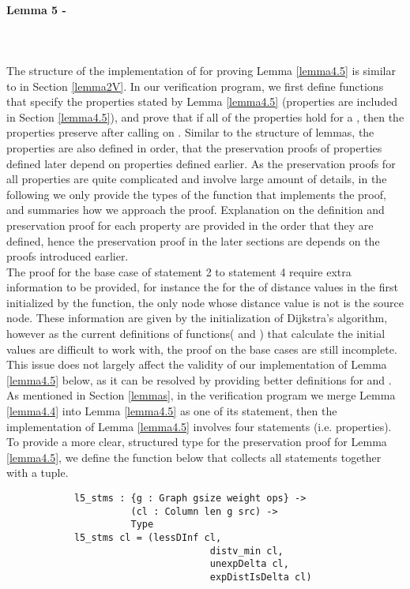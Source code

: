 \paragraph{Lemma 5 - } \label{lemma5V}
\tab\\\\
The structure of the implementation of  for proving Lemma \ref{lemma4.5} is similar to  in Section \ref{lemma2V}. In our verification program, we first define functions that specify the  properties stated by Lemma \ref{lemma4.5} (properties are included in Section \ref{lemma4.5}), and prove that if all of the properties hold for a  , then the properties preserve after calling  on . Similar to the structure of lemmas, the properties are also defined in order, that the preservation proofs of properties defined later depend on properties defined earlier. As the preservation proofs for all properties are quite complicated and involve large amount of details, in the following we only provide the types of the function that implements the proof, and summaries how we approach the proof. Explanation on the definition and preservation proof for each property are provided in the order that they are defined, hence the preservation proof in the later sections are depends on the proofs introduced earlier. 
\\

The proof for the base case of statement 2 to statement 4 require extra information to be provided, for instance the for the  of distance values in the first  initialized by the  function, the only node whose distance value is not  is the source node. These information are given by the initialization of Dijkstra's algorithm, however as the current definitions of functions( and ) that calculate the initial values are difficult to work with, the proof on the base cases are still incomplete. This issue does not largely affect the validity of our implementation of Lemma \ref{lemma4.5} below, as it can be resolved by providing better definitions for  and . 
\\

As mentioned in Section \ref{lemmas}, in the verification program we merge Lemma \ref{lemma4.4} into Lemma \ref{lemma4.5} as one of its statement, then the implementation of Lemma \ref{lemma4.5} involves four statements (i.e.  properties). To provide a more clear, structured type for the preservation proof for Lemma \ref{lemma4.5}, we define the  function below that collects all statements together with a tuple. 
\begin{lstlisting}
			l5_stms : {g : Graph gsize weight ops} ->
			          (cl : Column len g src) ->
			          Type
			l5_stms cl = (lessDInf cl, 
						  			distv_min cl, 
				 		  			unexpDelta cl, 
						  			expDistIsDelta cl)
\end{lstlisting}

